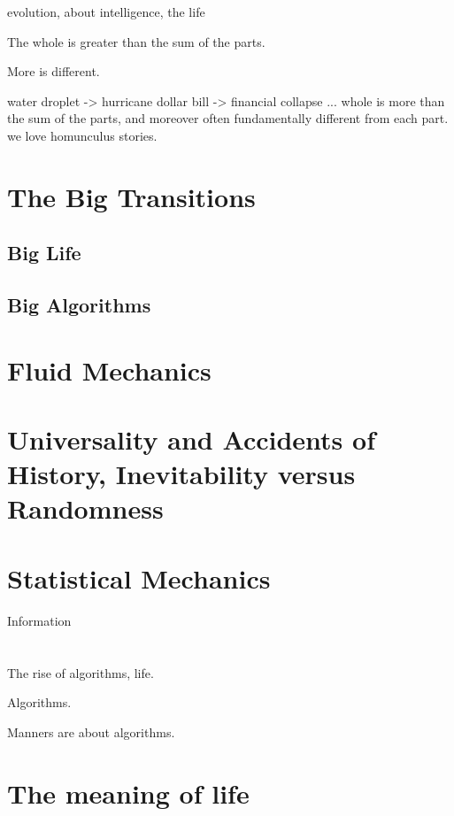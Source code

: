 evolution, about intelligence,
the life

The whole is greater than the sum of the parts.

More is different.



water droplet -> hurricane
dollar bill -> financial collapse 
...
whole is more than the sum of the parts,
and moreover often fundamentally different from each part.
we love homunculus stories.

\section{The Big Transitions}

\subsection{Big Life}

\subsection{Big Algorithms}

\section{Fluid Mechanics}

\section{Universality and Accidents of History, Inevitability versus Randomness}

\section{Statistical Mechanics}


Information

\section{}

The rise of algorithms, life.

Algorithms.

Manners are about algorithms.

\section{The meaning of life}

